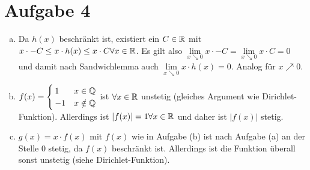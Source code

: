 \documentclass{article}
\begin{document}
    \section*{Aufgabe 4}
    \begin{enumerate}[(a)]
        \item Da $h(x)$ beschränkt ist, existiert ein $C \in \mathbb{R}$ mit $x\cdot -C \leq x \cdot h(x) \leq x \cdot C \forall x \in \mathbb{R}$. Es gilt also $\lim\limits_{x\searrow0} x \cdot -C = \lim\limits_{x\searrow0} x \cdot C = 0$ und damit nach Sandwichlemma auch $\lim\limits_{x\searrow0} x \cdot h(x) = 0$. Analog für $x \nearrow 0$.
        \item $f(x) = \begin{cases}
            1 & x \in \mathbb{Q}\\
            -1 & x \notin \mathbb{Q}
        \end{cases}$ ist $\forall x \in \mathbb{R}$ unstetig (gleiches Argument wie Dirichlet-Funktion). Allerdings ist $|f(x)| = 1 \forall x \in \mathbb{R}$ und daher ist $|f(x)|$ stetig.
        \item $g(x) = x \cdot f(x)$ mit $f(x)$ wie in Aufgabe (b) ist nach Aufgabe (a) an der Stelle 0 stetig, da $f(x)$ beschränkt ist. Allerdings ist die Funktion überall sonst unstetig (siehe Dirichlet-Funktion).
    \end{enumerate}
    
\end{document}
